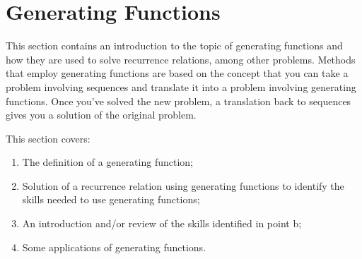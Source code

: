 \documentclass[10pt,]{book}
\theoremstyle{plain}
\theoremstyle{definition}
\theoremstyle{definition}
\theoremstyle{definition}
\theoremstyle{definition}
\numberwithin{equation}{section}
\begin{document}
\section[Generating Functions]{Generating Functions}\label{s-generating-functions}
\typeout{************************************************}
\typeout{************************************************}
This section contains an introduction to the topic of generating functions and how they are used to solve recurrence relations, among other problems.
Methods that employ generating functions are based on the concept that you can take a problem involving sequences and translate it into a problem
involving generating functions. Once you've solved the new problem, a translation back to sequences gives you a solution of the original problem.%
\par
This section covers:%
\par
\leavevmode%
\begin{enumerate}[label=\arabic*]
\item\hypertarget{li-113}{}The definition of a generating function;%
\item\hypertarget{li-114}{}Solution of a recurrence relation using generating functions to identify the skills needed to use generating functions;\\%
\item\hypertarget{li-115}{}An introduction and/or review of the skills identified in point b;\\%
\item\hypertarget{li-116}{}Some applications of generating functions.%
\end{enumerate}
%
\typeout{************************************************}
\typeout{************************************************}
\end{document}
